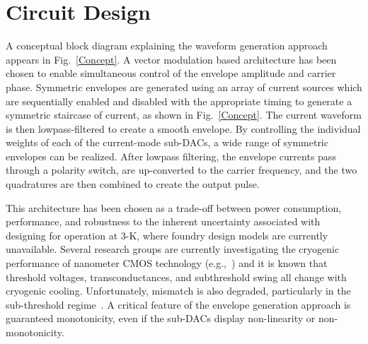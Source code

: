 \documentclass[journal]{IEEEtran}
\newcommand{\CR}[1]{{\color{black}#1}}
\begin{document}






\section{Circuit Design}
A conceptual block diagram explaining the waveform generation approach appears in Fig.~\ref{Concept}. A vector modulation based architecture has been chosen to enable simultaneous control of the envelope amplitude and carrier phase. Symmetric envelopes are generated using an array of current sources which are sequentially enabled and disabled with the appropriate timing to generate a symmetric staircase of current, as shown in Fig.~\ref{Concept}. The current waveform is then lowpass-filtered to create a smooth envelope. By controlling the individual weights of each of the current-mode sub-DACs, a wide range of symmetric envelopes can be realized. After lowpass filtering, the envelope currents pass through a polarity switch, are up-converted to the carrier frequency, and the two quadratures are then combined to create the output pulse. 


This architecture has been chosen as a trade-off between power consumption, performance, and robustness to the inherent uncertainty associated with designing for operation at 3-K, where foundry design models are currently unavailable. Several research groups are currently investigating the cryogenic performance of nanometer CMOS technology (e.g.,~\cite{incandela2018characterization,beckers2018characterization}) and it is known that threshold voltages, transconductances, and subthreshold \CR{swing} all change with cryogenic cooling. Unfortunately, mismatch is also degraded, particularly in the sub-threshold regime~\cite{mismatch}. A critical feature of the envelope generation approach is guaranteed monotonicity, even if the sub-DACs display non-linearity or non-monotonicity.
\end{document}
